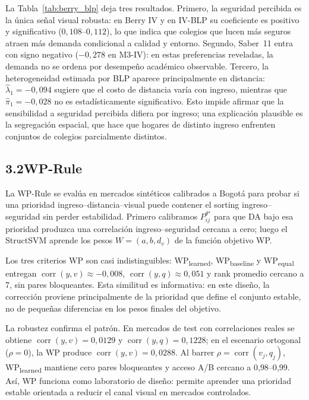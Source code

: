 \documentclass[12pt,a4paper]{article}
\begin{document}
La Tabla~\ref{tab:berry_blp} deja tres resultados. Primero, la seguridad
percibida es la única señal visual robusta: en Berry IV y en IV-BLP su coeficiente
es positivo y significativo ($0{,}108$--$0{,}112$), lo que indica que colegios que
lucen más seguros atraen más demanda condicional a calidad y entorno. Segundo,
Saber~11 entra con signo negativo ($-0{,}278$ en M3-IV): en estas preferencias
reveladas, la demanda no se ordena por desempeño académico observable. Tercero,
la heterogeneidad estimada por BLP aparece principalmente en distancia:
$\hat{\lambda}_1=-0{,}094$ sugiere que el costo de distancia varía con ingreso,
mientras que $\hat{\pi}_1=-0{,}028$ no es estadísticamente significativo. Esto
impide afirmar que la sensibilidad a seguridad percibida difiera por ingreso; una
explicación plausible es la segregación espacial, que hace que hogares de distinto
ingreso enfrenten conjuntos de colegios parcialmente distintos.

\subsection*{3.2\quad WP-Rule}

La WP-Rule se evalúa en mercados sintéticos calibrados a Bogotá para probar si
una prioridad ingreso--distancia--visual puede contener el sorting
ingreso--seguridad sin perder estabilidad. Primero calibramos
$P^{\theta^\star}_{ij}$ para que DA bajo esa prioridad produzca una correlación
ingreso--seguridad cercana a cero; luego el StructSVM aprende los pesos
$W=(a,b,d_v)$ de la función objetivo WP.

Los tres criterios WP son casi indistinguibles: WP\textsubscript{learned},
WP\textsubscript{baseline} y WP\textsubscript{equal} entregan
$\operatorname{corr}(y,v)\approx-0{,}008$, $\operatorname{corr}(y,q)\approx0{,}051$
y rank promedio cercano a 7, sin pares bloqueantes. Esta similitud es informativa:
en este diseño, la corrección proviene principalmente de la prioridad que define
el conjunto estable, no de pequeñas diferencias en los pesos finales del objetivo.

La robustez confirma el patrón. En mercados de test con correlaciones reales se
obtiene $\operatorname{corr}(y,v)=0{,}0129$ y
$\operatorname{corr}(y,q)=0{,}1228$; en el escenario ortogonal ($\rho=0$), la WP
produce $\operatorname{corr}(y,v)=0{,}0288$. Al barrer
$\rho=\operatorname{corr}(v_j,q_j)$, WP\textsubscript{learned} mantiene cero pares
bloqueantes y acceso A/B cercano a 0{,}98--0{,}99. Así, WP funciona como
laboratorio de diseño: permite aprender una prioridad estable orientada a reducir
el canal visual en mercados controlados.
\end{document}
